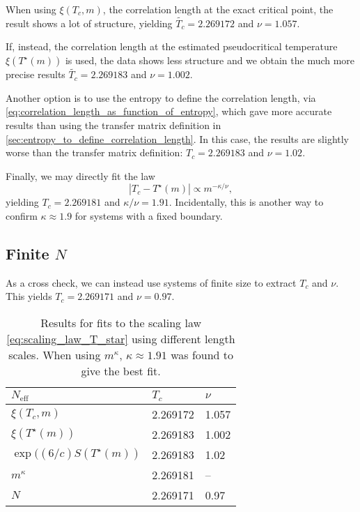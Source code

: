 When using $\xi(T_c, m)$, the correlation length at the exact critical point,
the result shows a lot of structure, yielding $\widetilde{T_c} = 2.269172$ and $\nu = 1.057$.

If, instead, the correlation length at the estimated pseudocritical temperature $\xi(T^{\star}(m))$ is used,
the data shows less structure and we obtain the much more precise results $\widetilde{T_c} = 2.269183$ and $\nu =
1.002$.

Another option is to use the entropy to define the correlation length,
via \autoref{eq:correlation_length_as_function_of_entropy}, which gave more accurate results than using the transfer
matrix definition in \autoref{sec:entropy_to_define_correlation_length}.
In this case, the results are slightly worse than the transfer matrix definition:
$T_c = 2.269183$ and $\nu = 1.02$.

Finally, we may directly fit the law
\begin{equation}
  |T_c - T^{\star}(m)| \propto m^{-\kappa/\nu},
\end{equation}
yielding $T_c = 2.269181$ and $\kappa/\nu = 1.91$.
Incidentally, this is another way to confirm $\kappa \approx 1.9$ for systems with a fixed boundary.


\subsection{Finite $N$}
As a cross check, we can instead use systems of finite size to extract $T_c$ and $\nu$.
This yields $T_c = 2.269171$ and $\nu = 0.97$.

\begin{table}[]
\centering
\begin{tabular}{@{}lll@{}} \toprule
$N_{\text{eff}}$                  & $T_c$   & $\nu$   \\ \midrule
$\xi(T_c, m)$                     & 2.269172  & 1.057         \\
$\xi(T^{\star}(m))$               & 2.269183   & 1.002        \\
$\exp((6/c)S(T^{\star}(m))$       & 2.269183   & 1.02       \\
$m^{\kappa}$                      & 2.269181  & --        \\
$N$                               & 2.269171  & 0.97          \\ \bottomrule
\end{tabular}
  \caption{Results for fits to the scaling law \autoref{eq:scaling_law_T_star} using different length scales.
  When using $m^{\kappa}$, $\kappa \approx 1.91$ was found to give the best fit.} \label{table:T_star_nu_results}
\end{table}


